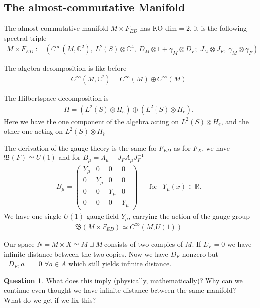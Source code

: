 \documentclass[a4paper]{article}
\theoremstyle{definition}
\theoremstyle{definition}
\newtheorem{question}{Question}
\theoremstyle{definition}
\theoremstyle{theorem}
\theoremstyle{theorem}
\theoremstyle{theorem}
\begin{document}
\subsection{The almost-commutative Manifold}
The almost commutative manifold $M\times F_{ED}$ has KO-dim$=2$, it is the
following spectral triple
\begin{align}
    M\times F_{ED} := \left(C^\infty(M,\mathbb{C}^2),\ L^2(S)\otimes
    \mathbb{C}^4,\
    D_M\otimes 1 +\gamma _M \otimes D_F;\; J_M\otimes J_F,\ \gamma_M\otimes
    \gamma _F\right)
\end{align}

The algebra decomposition is like before
\begin{align}
    C^\infty(M, \mathbb{C}^2) = C^\infty (M) \oplus C^\infty (M)
\end{align}

The Hilbertspace decomposition is
\begin{align}
    H = (L^2(S) \otimes H_e ) \oplus (L^2(S) \otimes H_{\bar{e}}).
\end{align}
Here we have the one component of the algebra acting on $L^2(S) \otimes H_e$,
and the other one acting on $L^2(S) \otimes H_{\bar{e}}$
\newline

The derivation of the gauge theory is the same for $F_{ED}$ as for $F_X$, we
have $\mathfrak{B}(F) \simeq U(1)$ and for $B_\mu = A_\mu - J_F A_\mu
J_F^{-1}$
\begin{align}
    B_\mu =
    \begin{pmatrix}
        Y_\mu & 0 & 0 & 0 \\
        0 & Y_\mu& 0 & 0 \\
        0 & 0 & Y_\mu& 0 \\
        0 & 0 & 0 & Y_\mu
    \end{pmatrix} \;\;\;\;\;\ \text{for} \;\;\ Y_\mu (x) \in \mathbb{R}.
\end{align}
We have one single $U(1)$ gauge field $Y_\mu$, carrying the action of the
gauge group
\begin{align}
   \text{$\mathfrak{B}$}(M\times F_{ED}) \simeq C^\infty(M, U(1))
\end{align}

Our space $N = M\times X \simeq M\sqcup M$ consists of two compies of $M$.
If $D_F = 0$ we have infinite distance between the two copies. Now we have $D_F$
nonzero but $[D_F, a] = 0$ $\forall a \in A$ which still yields infinite
distance.
\begin{question}
    What does this imply (physically, mathematically)? Why can we continue
    even thought we have infinite distance between the same manifold? What do
    we get if we fix this?
\end{question}
\end{document}
